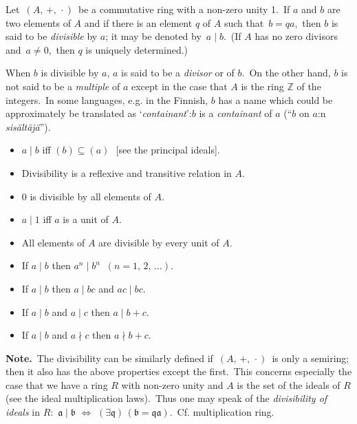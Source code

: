 \documentclass[12pt]{article}
\begin{document}
Let\, $(A,\,+,\,\cdot)$\, be a commutative ring with a non-zero 
unity 1.\, If $a$ and $b$ are two elements of $A$ and if there 
is an element $q$ of $A$ such that\, $b = qa$,\, then $b$ is 
said to be {\em divisible} by $a$; it may be denoted by\, 
$a\mid b$.\, (If $A$ has no zero divisors and\, $a \neq 0$,\, 
then $q$ is uniquely determined.)

When $b$ is divisible by $a$, $a$ is said to be a 
{\it divisor} or 
{\it {}} 
of $b$.\, On the other hand, $b$ is not said to be 
a {\it multiple} of $a$ except in the case that $A$ is the 
ring $\mathbb{Z}$ of the integers.\, In some languages, e.g. in 
the Finnish, $b$ has a name which could be approximately be 
translated as `{\it containant}':\quad  $b$ is a {\it containant} 
of $a$ (``$b$ on $a$:n {\it sis\"alt\"aj\"a}'').


\textbf{}
\begin{itemize}
\item $a\mid b$\; iff\; $(b)\subseteq (a)$\,\, [see the principal ideals].
\item Divisibility is a reflexive and transitive relation in $A$.
\item 0 is divisible by all elements of $A$.
\item $a\mid 1$\; iff\; $a$ is a unit of $A$.
\item All elements of $A$ are divisible by every unit of $A$.
\item If\; $a\mid b$\; then\; $a^n\mid b^n \;\; (n = 1,\,2,\,\ldots)$. 
\item If\; $a\mid b$\; then\; $a\mid bc$\; and\; $ac\mid bc$.
\item If\; $a\mid b$\; and\; $a\mid c$\; then\; $a\mid b\!+\!c$.
\item If\; $a\mid b$\; and\; $a\nmid c$\; then\; $a\nmid b\!+\!c$.
\end{itemize}

\textbf{Note.}\, The divisibility can be similarly defined if\, 
$(A,\,+,\,\cdot)$\, is only a semiring; then it also has the 
above properties except the first.\, This concerns especially 
the case that we have a ring $R$ with non-zero unity and $A$ is 
the set of the ideals of $R$ (see the ideal multiplication laws).\,
Thus one may speak of the {\em divisibility of ideals} in 
$R$:\, $\mathfrak{a\mid b\,\,\Leftrightarrow\,\, 
(\exists q)\,(b = qa)}$.\, Cf. multiplication ring.

\end{document}

